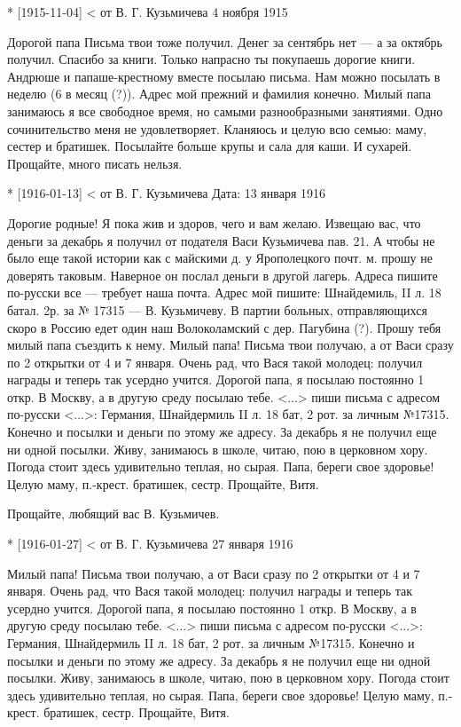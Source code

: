 \documentclass[]{memoir}
\begin{document}
* [1915-11-04] < от В. Г. Кузьмичева 
4 ноября 1915

Дорогой папа Письма твои тоже получил. Денег за сентябрь нет — а за октябрь получил. Спасибо за книги. Только напрасно ты покупаешь дорогие книги. Андрюше и папаше-крестному вместе посылаю письма. Нам можно посылать в неделю (6 в месяц (?)). Адрес мой прежний и фамилия конечно. Милый папа занимаюсь я все свободное время, но самыми разнообразными занятиями. Одно сочинительство меня не удовлетворяет. Кланяюсь и целую всю семью: маму, сестер и братишек. Посылайте больше крупы и сала для каши. И сухарей.
Прощайте, много писать нельзя.


* [1916-01-13] < от В. Г. Кузьмичева 
Дата: 13 января 1916

Дорогие родные! Я пока жив и здоров, чего и вам желаю. Извещаю вас, что деньги за декабрь я получил от подателя Васи Кузьмичева пав. 21. А чтобы не было еще такой истории как с майскими д. у Ярополецкого почт. м. прошу не доверять таковым. Наверное он послал деньги в другой лагерь. Адреса пишите по-русски все — требует наша почта. Адрес мой пишите: Шнайдемиль, II л. 18 батал. 2р. за № 17315 — В. Кузьмичеву. В партии больных, отправляющихся скоро в Россию едет один наш Волоколамский с дер. Пагубина (?). Прошу тебя милый папа съездить к нему. Милый папа! Письма твои получаю, а от Васи сразу по 2 открытки от 4 и 7 января. Очень рад, что Вася такой молодец: получил награды и теперь так усердно учится. Дорогой папа, я посылаю постоянно 1 откр. В Москву, а в другую среду посылаю тебе. <...> пиши письма с адресом по-русски <...>: Германия, Шнайдермиль II л. 18 бат, 2 рот. за личным №17315. Конечно и посылки и деньги по этому же адресу. За декабрь я не получил еще ни одной посылки. Живу, занимаюсь в школе, читаю, пою в церковном хору. Погода стоит здесь удивительно теплая, но сырая. Папа, береги свое здоровье! Целую маму, п.-крест. братишек, сестр. Прощайте, Витя.

Прощайте, любящий вас В. Кузьмичев.

* [1916-01-27] < от В. Г. Кузьмичева 
27 января 1916

Милый папа! Письма твои получаю, а от Васи сразу по 2 открытки от 4 и 7 января. Очень рад, что Вася такой молодец: получил награды и теперь так усердно учится. Дорогой папа, я посылаю постоянно 1 откр. В Москву, а в другую среду посылаю тебе. <...> пиши письма с адресом по-русски <...>: Германия, Шнайдермиль II л. 18 бат, 2 рот. за личным №17315. Конечно и посылки и деньги по этому же адресу. За декабрь я не получил еще ни одной посылки. Живу, занимаюсь в школе, читаю, пою в церковном хору. Погода стоит здесь удивительно теплая, но сырая. Папа, береги свое здоровье! Целую маму, п.-крест. братишек, сестр. Прощайте, Витя.
\end{document}
